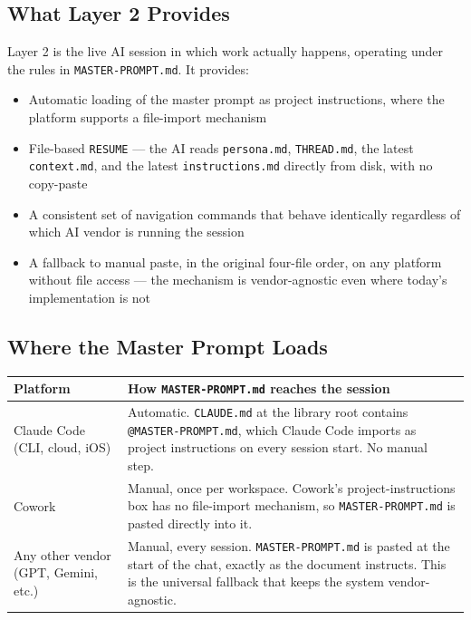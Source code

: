 \documentclass[12pt,letterpaper]{article}
\begin{document}
\subsection{What Layer 2 Provides}

Layer 2 is the live AI session in which work actually happens, operating
under the rules in \texttt{MASTER-PROMPT.md}. It provides:

\begin{itemize}
  \item Automatic loading of the master prompt as project instructions,
        where the platform supports a file-import mechanism
  \item File-based \texttt{RESUME} --- the AI reads
        \texttt{persona.md}, \texttt{THREAD.md}, the latest
        \texttt{context.md}, and the latest \texttt{instructions.md}
        directly from disk, with no copy-paste
  \item A consistent set of navigation commands that behave identically
        regardless of which AI vendor is running the session
  \item A fallback to manual paste, in the original four-file order,
        on any platform without file access --- the mechanism is
        vendor-agnostic even where today's implementation is not
\end{itemize}

\subsection{Where the Master Prompt Loads}

\begin{center}
\begin{tabular}{@{}lp{8.5cm}@{}}
\toprule
\textbf{Platform} & \textbf{How \texttt{MASTER-PROMPT.md} reaches the session} \\
\midrule
Claude Code (CLI, cloud, iOS) &
Automatic. \texttt{CLAUDE.md} at the library root contains
\texttt{@MASTER-PROMPT.md}, which Claude Code imports as project
instructions on every session start. No manual step. \\
Cowork &
Manual, once per workspace. Cowork's project-instructions box has no
file-import mechanism, so \texttt{MASTER-PROMPT.md} is pasted directly
into it. \\
Any other vendor (GPT, Gemini, etc.) &
Manual, every session. \texttt{MASTER-PROMPT.md} is pasted at the start
of the chat, exactly as the document instructs. This is the universal
fallback that keeps the system vendor-agnostic. \\
\bottomrule
\end{tabular}
\end{center}
\end{document}
